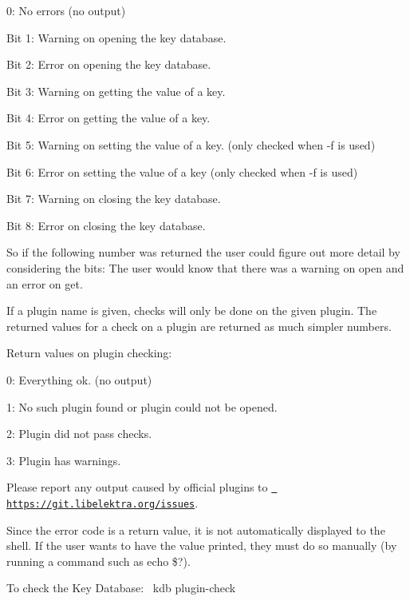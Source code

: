 \begin{DoxyItemize}
\item 0\+: No errors (no output)
\item Bit 1\+: Warning on opening the key database.
\item Bit 2\+: Error on opening the key database.
\item Bit 3\+: Warning on getting the value of a key.
\item Bit 4\+: Error on getting the value of a key.
\item Bit 5\+: Warning on setting the value of a key. (only checked when {\ttfamily -\/f} is used)
\item Bit 6\+: Error on setting the value of a key (only checked when {\ttfamily -\/f} is used)
\item Bit 7\+: Warning on closing the key database.
\item Bit 8\+: Error on closing the key database.
\end{DoxyItemize}

So if the following number was returned {} the user could figure out more detail by considering the bits\+: {} The user would know that there was a warning on open and an error on get.

If a plugin name is given, checks will only be done on the given plugin. The returned values for a check on a plugin are returned as much simpler numbers.

Return values on plugin checking\+:


\begin{DoxyItemize}
\item 0\+: Everything ok. (no output)
\item 1\+: No such plugin found or plugin could not be opened.
\item 2\+: Plugin did not pass checks.
\item 3\+: Plugin has warnings.
\end{DoxyItemize}

Please report any output caused by official plugins to \href{https://git.libelektra.org/issues}{\texttt{ https\+://git.\+libelektra.\+org/issues}}.

Since the error code is a return value, it is not automatically displayed to the shell. If the user wants to have the value printed, they must do so manually (by running a command such as {\ttfamily echo \$?}).

To check the Key Database\+:~\newline
 {\ttfamily kdb plugin-\/check}

